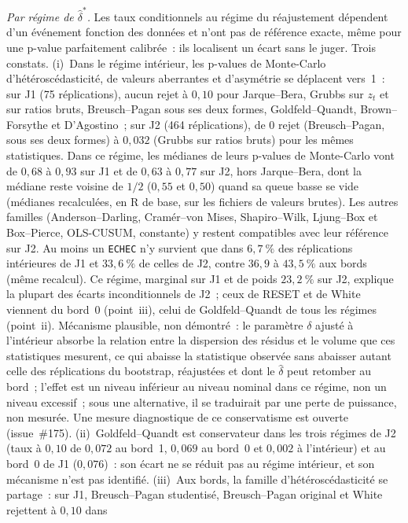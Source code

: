 \documentclass[a4paper,11pt]{article}
\newcommand{\code}[1]{\texttt{\small #1}}
\begin{document}
\emph{Par régime de $\hat\delta^{*}$.} Les taux conditionnels au régime du réajustement
dépendent d'un événement fonction des données et n'ont pas de référence exacte, même pour une
p-value parfaitement calibrée~: ils localisent un écart sans le juger. Trois constats.
(i)~Dans le régime intérieur, les p-values de Monte-Carlo d'hétéroscédasticité, de valeurs
aberrantes et d'asymétrie se déplacent vers~1~: sur J1 (75 réplications), aucun rejet à
$0{,}10$ pour Jarque--Bera, Grubbs sur $z_t$ et sur ratios bruts, Breusch--Pagan sous ses deux
formes, Goldfeld--Quandt, Brown--Forsythe et D'Agostino~; sur J2 (464 réplications), de 0 rejet
(Breusch--Pagan, sous ses deux formes) à $0{,}032$ (Grubbs sur ratios bruts) pour les mêmes
statistiques. Dans ce régime, les médianes de leurs p-values de Monte-Carlo vont de $0{,}68$ à
$0{,}93$ sur J1 et de $0{,}63$ à $0{,}77$ sur J2, hors Jarque--Bera, dont la médiane reste
voisine de $1/2$ ($0{,}55$ et $0{,}50$) quand sa queue basse se vide (médianes recalculées, en
R de base, sur les fichiers de valeurs brutes). Les autres familles (Anderson--Darling,
Cramér--von Mises, Shapiro--Wilk, Ljung--Box et Box--Pierce, OLS-CUSUM, constante) y restent
compatibles avec leur référence sur J2. Au moins un \code{ECHEC} n'y survient que dans
$6{,}7~\%$ des réplications intérieures de J1 et $33{,}6~\%$ de celles de J2, contre $36{,}9$
à $43{,}5~\%$ aux bords (même recalcul). Ce régime, marginal sur J1 et de poids $23{,}2~\%$ sur
J2, explique la plupart des écarts inconditionnels de J2~; ceux de RESET et de White viennent
du bord~0 (point~iii), celui de Goldfeld--Quandt de tous les régimes (point~ii). Mécanisme
plausible, non démontré~: le paramètre $\delta$ ajusté à l'intérieur absorbe la relation entre
la dispersion des résidus et le volume que ces statistiques mesurent, ce qui abaisse la
statistique observée sans abaisser autant celle des réplications du bootstrap, réajustées et
dont le $\hat\delta$ peut retomber au bord~; l'effet est un niveau inférieur au niveau nominal
dans ce régime, non un niveau excessif~; sous une alternative, il se traduirait par une perte de
puissance, non mesurée. Une mesure diagnostique de ce conservatisme est ouverte (issue~\#175).
(ii)~Goldfeld--Quandt est conservateur dans les trois régimes de J2 (taux à $0{,}10$ de
$0{,}072$ au bord~1, $0{,}069$ au bord~0 et $0{,}002$ à l'intérieur) et au bord~0 de J1
($0{,}076$)~: son écart ne se réduit pas au régime intérieur, et son mécanisme n'est pas
identifié. (iii)~Aux bords, la famille d'hétéroscédasticité se partage~: sur J1,
Breusch--Pagan studentisé, Breusch--Pagan original et White rejettent à $0{,}10$ dans
\end{document}
